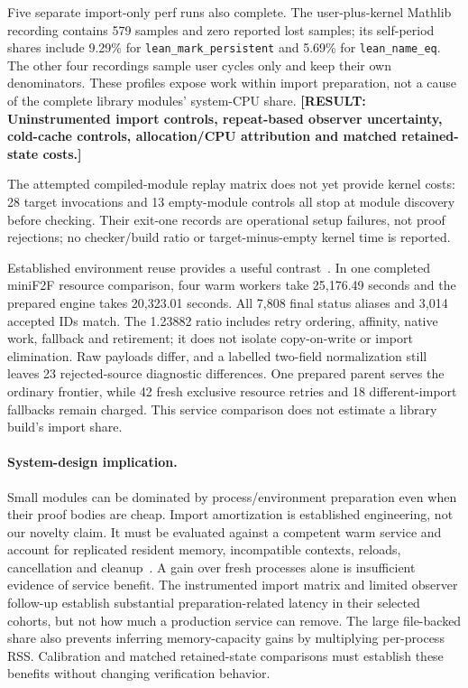 \documentclass[10pt,twocolumn]{article}
\newcommand{\missing}[1]{\textbf{[RESULT: #1]}}
\begin{document}
Five separate import-only perf runs also complete.
The user-plus-kernel Mathlib recording contains 579 samples and zero
reported lost samples; its self-period shares include 9.29\% for
\texttt{lean\_mark\_persistent} and 5.69\% for \texttt{lean\_name\_eq}.
The other four recordings sample user cycles only and keep their own
denominators. These profiles expose work within import preparation,
not a cause of the complete library modules' system-CPU share.
\missing{Uninstrumented import controls, repeat-based observer uncertainty,
cold-cache controls, allocation/CPU attribution and matched retained-state costs.}

The attempted compiled-module replay matrix does not yet provide kernel
costs: 28 target invocations and 13 empty-module controls all stop at
module discovery before checking.
Their exit-one records are operational setup failures, not proof rejections;
no checker/build ratio or target-minus-empty kernel time is reported.

Established environment reuse provides a useful contrast~\cite{repl,kimina}.
In one completed miniF2F resource comparison, four warm workers take
25,176.49 seconds and the prepared engine takes 20,323.01 seconds.
All 7,808 final status aliases and 3,014 accepted IDs match.
The 1.23882 ratio includes retry ordering, affinity, native work, fallback
and retirement; it does not isolate copy-on-write or import elimination.
Raw payloads differ, and a labelled two-field normalization still leaves
23 rejected-source diagnostic differences.
One prepared parent serves the ordinary frontier, while 42 fresh exclusive
resource retries and 18 different-import fallbacks remain charged.
This service comparison does not estimate a library build's import share.

\paragraph{System-design implication.}
Small modules can be dominated by process/environment preparation even when
their proof bodies are cheap. Import amortization is established engineering,
not our novelty claim. It must be evaluated against a competent warm service
and account for replicated resident memory, incompatible contexts, reloads,
cancellation and cleanup~\cite{fork}.
A gain over fresh processes alone is insufficient evidence of service benefit.
The instrumented import matrix and limited observer follow-up establish
substantial preparation-related latency in their selected cohorts, but not
how much a production service can remove. The large file-backed share also prevents inferring memory-capacity
gains by multiplying per-process RSS. Calibration and matched retained-state
comparisons must establish these benefits without changing verification
behavior.
\end{document}
